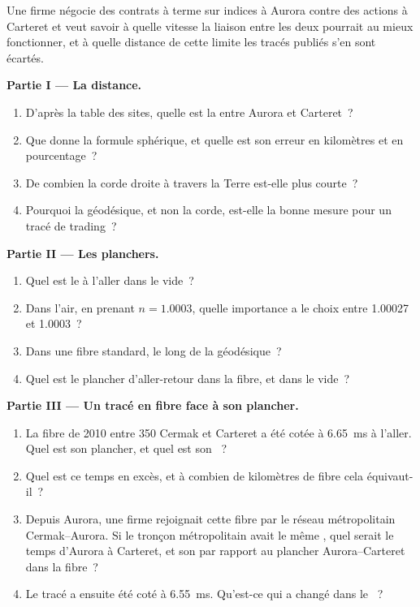 \begin{problem}\label{pb:nw:the-north-american-map:1}
Une firme négocie des contrats à terme sur indices à Aurora contre des actions à Carteret et veut savoir à quelle vitesse la liaison entre les deux pourrait au mieux fonctionner, et à quelle distance
de cette limite les tracés publiés s'en sont écartés.

\medskip\noindent\textbf{Partie I --- La distance.}
\begin{enumerate}
\item D'après la table des sites, quelle est la  entre Aurora et Carteret~?
\item Que donne la formule sphérique, et quelle est son erreur en kilomètres et en pourcentage~?
\item De combien la corde droite à travers la Terre est-elle plus courte~?
\item Pourquoi la géodésique, et non la corde, est-elle la bonne mesure pour un tracé de trading~?
\end{enumerate}

\medskip\noindent\textbf{Partie II --- Les planchers.}
\begin{enumerate}[resume]
\item Quel est le  à l'aller dans le vide~?
\item Dans l'air, en prenant $n = 1.0003$, quelle importance a le choix entre 1.00027 et 1.0003~?
\item Dans une fibre standard, le long de la géodésique~?
\item Quel est le plancher d'aller-retour dans la fibre, et dans le vide~?
\end{enumerate}

\medskip\noindent\textbf{Partie III --- Un tracé en fibre face à son plancher.}
\begin{enumerate}[resume]
\item La fibre de 2010 entre 350 Cermak et Carteret a été cotée à \qty{6.65}{\milli\second} à l'aller. Quel est son plancher, et quel est son ~?
\item Quel est ce temps en excès, et à combien de kilomètres de fibre cela équivaut-il~?
\item Depuis Aurora, une firme rejoignait cette fibre par le réseau métropolitain Cermak--Aurora. Si le tronçon métropolitain avait le même , quel serait le temps
  d'Aurora à Carteret, et son  par rapport au plancher Aurora--Carteret dans la fibre~?
\item Le tracé a ensuite été coté à \qty{6.55}{\milli\second}. Qu'est-ce qui a changé dans le ~?
\end{enumerate}


\end{problem}
